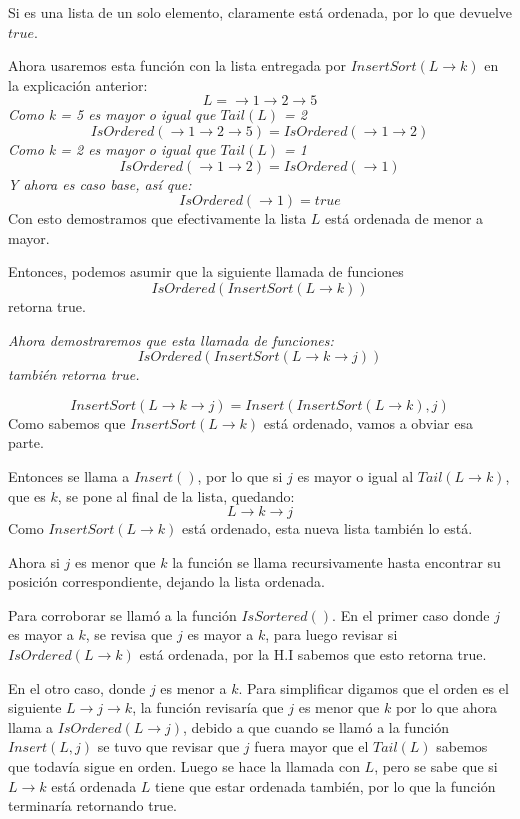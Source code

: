 \documentclass[../doc.tex]{subfiles}
\begin{document}
Si es una lista de un solo elemento, claramente está ordenada, por lo que 
devuelve $true$.

Ahora usaremos esta función con la lista entregada por $InsertSort(L \rightarrow k)$ en la explicación anterior:
\[L = \rightarrow 1 \rightarrow 2 \rightarrow 5\]
\emph{Como k = 5 es mayor o igual que $Tail(L)$ = 2}
\[IsOrdered(\rightarrow 1 \rightarrow 2 \rightarrow 5) = IsOrdered(\rightarrow 1 \rightarrow 2)\]
\emph{Como k = 2 es mayor o igual que $Tail(L)$ = 1}
\[IsOrdered(\rightarrow 1 \rightarrow 2) = IsOrdered(\rightarrow 1)\]
\emph{Y ahora es caso base, así que: }
\[IsOrdered(\rightarrow 1) = true\]
Con esto demostramos que efectivamente la lista $L$ está ordenada de menor a mayor. 

\noindent Entonces, podemos asumir que la siguiente llamada de funciones
\[IsOrdered(InsertSort(L \rightarrow k))\]
retorna true.

\emph{Ahora demostraremos que esta llamada de funciones:}
\[IsOrdered(InsertSort(L \rightarrow k \rightarrow j))\]
\emph{también retorna true.}

\[InsertSort(L \rightarrow k \rightarrow j) = Insert(InsertSort(L \rightarrow k), j)\]
Como sabemos que $ InsertSort(L \rightarrow k) $ está ordenado, vamos a obviar esa parte.

Entonces se llama a $Insert()$, por lo que si $j$ es mayor o igual al
$Tail(L \rightarrow k)$, que es $k$, se pone al final de la lista, quedando:
\[L \rightarrow k \rightarrow j\]
Como $ InsertSort(L \rightarrow k) $ está ordenado, esta nueva lista también lo está.

Ahora si $j$ es menor que $k$ la función se llama recursivamente
hasta encontrar su posición correspondiente, dejando la lista ordenada.

Para corroborar se llamó a la función $IsSortered()$. En el primer caso donde $j$ es
mayor a $k$, se revisa que $j$ es mayor a $k$, para luego revisar si
$IsOrdered(L \rightarrow k)$ está ordenada, por la H.I sabemos que esto retorna true.

En el otro caso, donde $j$ es menor a $k$. Para simplificar digamos que el orden es el
siguiente $L \rightarrow j \rightarrow k$, la función revisaría que $j$ es menor que
$k$ por lo que ahora llama a $IsOrdered(L \rightarrow j)$, debido a que cuando se llamó a
la función $Insert(L, j)$ se tuvo que revisar que $j$ fuera mayor que el $Tail(L)$
sabemos que todavía sigue en orden. Luego se hace la llamada con $L$, pero se sabe que
si $L \rightarrow k$ está ordenada $L$ tiene que estar ordenada también, por lo que
la función terminaría retornando true.
\end{document}
